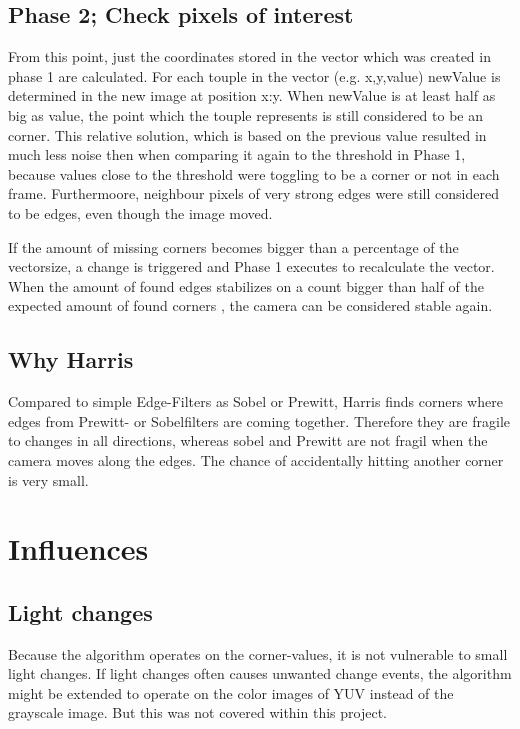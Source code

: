 \subsection{Phase 2; Check pixels of interest}
From this point, just the coordinates stored in the vector which was created in phase 1 are calculated.  For each touple in the vector (e.g. x,y,value) newValue is determined in the new image at position x:y. When newValue is at least half as big as value, the point which the touple represents is still considered to be an corner. This relative solution, which is based on the previous value resulted in much less noise then when comparing it again to the threshold in Phase 1, because values close to the threshold were toggling to be a corner or not in each frame. Furthermoore, neighbour pixels of very strong edges were still considered to be edges, even though the image moved. 

If the amount of missing corners becomes bigger than a percentage of the vectorsize, a change is triggered and Phase 1 executes to recalculate the vector. When the amount of found edges stabilizes on a count bigger than half of the expected amount of found corners , the  camera can be considered stable again.

\subsection{Why Harris}
Compared to simple Edge-Filters as Sobel or Prewitt, Harris finds corners where edges from Prewitt- or Sobelfilters are coming together. Therefore they are fragile to changes in all directions, whereas sobel and Prewitt are not fragil when the camera moves along the edges. The chance of accidentally hitting another corner is very small.



\section{Influences}
\subsection{Light changes}
Because the algorithm operates on the corner-values, it is not vulnerable to small light changes. If light changes often causes unwanted change events, the algorithm might be extended to operate on the color images of YUV instead of the grayscale image. But this was not covered within this project.

